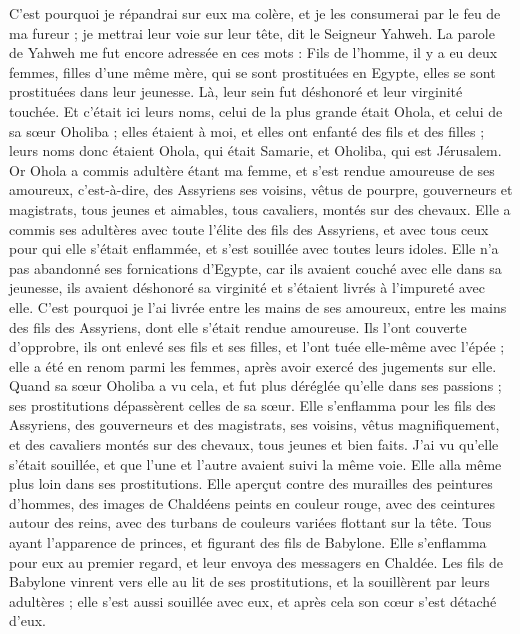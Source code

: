 \begin{multicols}{2}
C'est pourquoi je répandrai sur eux ma colère, et je les consumerai par le feu de ma fureur ; je mettrai leur voie sur leur tête, dit le Seigneur Yahweh.
\VerseOne{}La parole de Yahweh me fut encore adressée en ces mots :
Fils de l’homme, il y a eu deux femmes, filles d'une même mère,
qui se sont prostituées en Egypte, elles se sont prostituées dans leur jeunesse. Là, leur sein fut déshonoré et leur virginité touchée.
Et c'était ici leurs noms, celui de la plus grande était Ohola, et celui de sa sœur Oholiba\FTNT{} ; elles étaient à moi, et elles ont enfanté des fils et des filles ; leurs noms donc étaient Ohola, qui était Samarie, et Oholiba, qui est Jérusalem.
Or Ohola a commis adultère étant ma femme, et s'est rendue amoureuse de ses amoureux, c'est-à-dire, des Assyriens ses voisins,
vêtus de pourpre, gouverneurs et magistrats, tous jeunes et aimables, tous cavaliers, montés sur des chevaux.
Elle a commis ses adultères avec toute l'élite des fils des Assyriens, et avec tous ceux pour qui elle s’était enflammée, et s'est souillée avec toutes leurs idoles.
Elle n'a pas abandonné ses fornications d'Egypte, car ils avaient couché avec elle dans sa jeunesse, ils avaient déshonoré sa virginité et s'étaient livrés à l'impureté avec elle\FTNT{}.
C'est pourquoi je l'ai livrée entre les mains de ses amoureux, entre les mains des fils des Assyriens, dont elle s'était rendue amoureuse.
Ils l'ont couverte d'opprobre, ils ont enlevé ses fils et ses filles, et l'ont tuée elle-même avec l'épée ; elle a été en renom parmi les femmes, après avoir exercé des jugements sur elle.
Quand sa sœur Oholiba a vu cela, et fut plus déréglée qu'elle dans ses passions ; ses prostitutions dépassèrent celles de sa sœur.
Elle s’enflamma pour les fils des Assyriens, des gouverneurs et des magistrats, ses voisins, vêtus magnifiquement, et des cavaliers montés sur des chevaux, tous jeunes et bien faits.
J'ai vu qu'elle s'était souillée, et que l’une et l’autre avaient suivi la même voie.
Elle alla même plus loin dans ses prostitutions. Elle aperçut contre des murailles des peintures d’hommes, des images de Chaldéens peints en couleur rouge,
avec des ceintures autour des reins, avec des turbans de couleurs variées flottant sur la tête. Tous ayant l’apparence de princes, et figurant des fils de Babylone.
Elle s’enflamma pour eux au premier regard, et leur envoya des messagers en Chaldée.
Les fils de Babylone vinrent vers elle au lit de ses prostitutions, et la souillèrent par leurs adultères ; elle s'est aussi souillée avec eux, et après cela son cœur s'est détaché d'eux.

\end{multicols}
